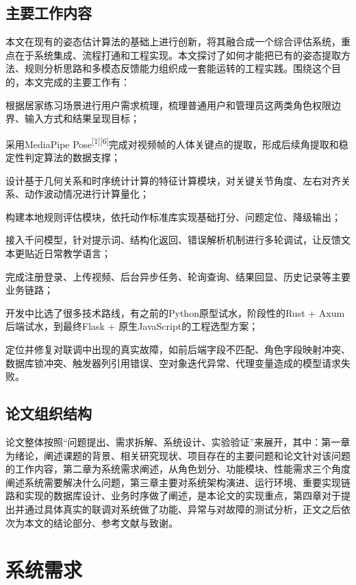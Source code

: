 \section{主要工作内容}
本文在现有的姿态估计算法的基础上进行创新，将其融合成一个综合评估系统，重点在于系统集成、流程打通和工程实现。本文探讨了如何才能把已有的姿态提取方法、规则分析思路和多模态反馈能力组织成一套能运转的工程实践。围绕这个目的，本文完成的主要工作有：
\begin{researchlist}
  \item 根据居家练习场景进行用户需求梳理，梳理普通用户和管理员这两类角色权限边界、输入方式和结果呈现目标；
  \item 采用MediaPipe Pose\textsuperscript{[1][6]}完成对视频帧的人体关键点的提取，形成后续角提取和稳定性判定算法的数据支撑；
  \item 设计基于几何关系和时序统计计算的特征计算模块，对关键关节角度、左右对齐关系、动作波动情况进行计算量化；
  \item 构建本地规则评估模块，依托动作标准库实现基础打分、问题定位、降级输出；
  \item 接入千问模型，针对提示词、结构化返回、错误解析机制进行多轮调试，让反馈文本更贴近日常教学语言；
  \item 完成注册登录、上传视频、后台异步任务、轮询查询、结果回显、历史记录等主要业务链路；
  \item 开发中比选了很多技术路线，有之前的Python原型试水，阶段性的Rust + Axum后端试水，到最终Flask + 原生JavaScript的工程选型方案；
  \item 定位并修复对联调中出现的真实故障，如前后端字段不匹配、角色字段映射冲突、数据库锁冲突、触发器列引用错误、空对象迭代异常、代理变量造成的模型请求失败。
\end{researchlist}



\section{论文组织结构}论文整体按照“问题提出、需求拆解、系统设计、实验验证”来展开，其中：第一章为绪论，阐述课题的背景、相关研究现状、项目存在的主要问题和论文针对该问题的工作内容，第二章为系统需求阐述，从角色划分、功能模块、性能需求三个角度阐述系统需要解决什么问题，第三章主要对系统架构演进、运行环境、重要实现链路和实现的数据库设计、业务时序做了阐述，是本论文的实现重点，第四章对于提出并通过具体真实的联调对系统做了功能、异常与对故障的测试分析，正文之后依次为本文的结论部分、参考文献与致谢。


\chapter{系统需求}

